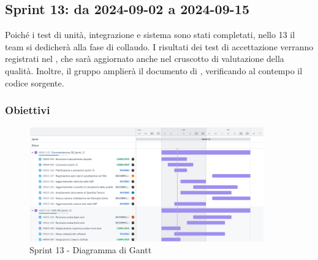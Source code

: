 \subsection{Sprint 13: da 2024-09-02 a 2024-09-15}
\par Poiché i test di unità, integrazione e sistema sono stati completati, nello  13 il team si dedicherà alla fase di collaudo. I risultati dei test di accettazione verranno registrati nel \PdQ, che sarà aggiornato anche nel cruscotto di valutazione della qualità. Inoltre, il gruppo amplierà il documento di \ST, verificando al contempo il codice sorgente.

\subsubsection{Obiettivi}

\begin{figure}[H]
  \centering
  \includegraphics[width=0.90\textwidth]{assets/Pianificazione/Sprint-13/gantt.png}
  \caption{Sprint 13 - Diagramma di Gantt}\label{fig:sprint-13-gantt}
\end{figure}

